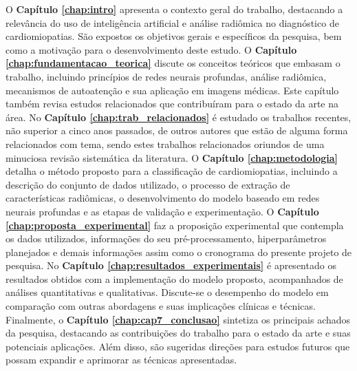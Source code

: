 O \textbf{Capítulo \ref{chap:intro}} apresenta o contexto geral do trabalho, destacando a relevância do uso de inteligência artificial e análise radiômica no diagnóstico de cardiomiopatias. São expostos os objetivos gerais e específicos da pesquisa, bem como a motivação para o desenvolvimento deste estudo. O \textbf{Capítulo \ref{chap:fundamentacao_teorica}} discute os conceitos teóricos que embasam o trabalho, incluindo princípios de redes neurais profundas, análise radiômica, mecanismos de autoatenção e sua aplicação em imagens médicas. Este capítulo também revisa estudos relacionados que contribuíram para o estado da arte na área. No \textbf{Capítulo \ref{chap:trab_relacionados}} é estudado  os trabalhos recentes, não superior a cinco anos passados, de outros autores que estão de alguma forma relacionados com tema, sendo estes trabalhos relacionados oriundos de uma minuciosa revisão sistemática da literatura. O \textbf{Capítulo \ref{chap:metodologia}} detalha o método proposto para a classificação de cardiomiopatias, incluindo a descrição do conjunto de dados utilizado, o processo de extração de características radiômicas, o desenvolvimento do modelo baseado em redes neurais profundas e as etapas de validação e experimentação. O \textbf{Capítulo \ref{chap:proposta_experimental}} faz a proposição experimental que contempla os dados utilizados, informações do seu pré-processamento, hiperparâmetros planejados e demais informações assim como o cronograma do presente projeto de pesquisa.  No \textbf{Capítulo \ref{chap:resultados_experimentais}} é apresentado os resultados obtidos com a implementação do modelo proposto, acompanhados de análises quantitativas e qualitativas. Discute-se o desempenho do modelo em comparação com outras abordagens e suas implicações clínicas e técnicas. Finalmente, o \textbf{Capítulo \ref{chap:cap7_conclusao}} sintetiza os principais achados da pesquisa, destacando as contribuições do trabalho para o estado da arte e suas potenciais aplicações. Além disso, são sugeridas direções para estudos futuros que possam expandir e aprimorar as técnicas apresentadas.



